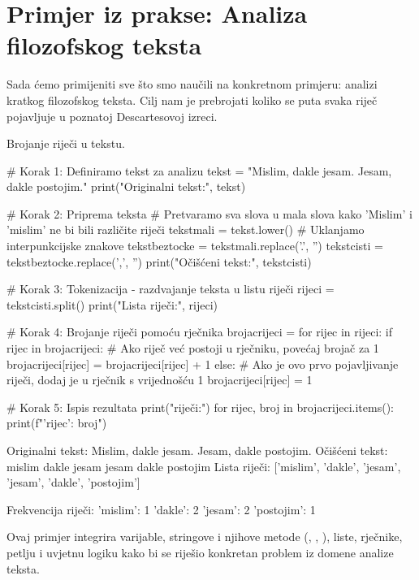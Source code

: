\section{Primjer iz prakse: Analiza filozofskog teksta}
\label{sec:primjerprakse}

Sada ćemo primijeniti sve što smo naučili na konkretnom primjeru: analizi kratkog filozofskog teksta. Cilj nam je prebrojati koliko se puta svaka riječ pojavljuje u poznatoj Descartesovoj izreci.

\begin{primjerokvir}
    Brojanje riječi u tekstu.
    \begin{pythoncode}
# Korak 1: Definiramo tekst za analizu
tekst = "Mislim, dakle jesam. Jesam, dakle postojim."
print("Originalni tekst:", tekst)

# Korak 2: Priprema teksta
# Pretvaramo sva slova u mala slova kako 'Mislim' i 'mislim' ne bi bili različite riječi
tekstmali = tekst.lower()
# Uklanjamo interpunkcijske znakove
tekstbeztocke = tekstmali.replace('.', '')
tekstcisti = tekstbeztocke.replace(',', '')
print("Očišćeni tekst:", tekstcisti)

# Korak 3: Tokenizacija - razdvajanje teksta u listu riječi
rijeci = tekstcisti.split()
print("Lista riječi:", rijeci)

# Korak 4: Brojanje riječi pomoću rječnika
brojacrijeci = {}
for rijec in rijeci:
    if rijec in brojacrijeci:
        # Ako riječ već postoji u rječniku, povećaj brojač za 1
        brojacrijeci[rijec] = brojacrijeci[rijec] + 1
    else:
        # Ako je ovo prvo pojavljivanje riječi, dodaj je u rječnik s vrijednošću 1
        brojacrijeci[rijec] = 1

# Korak 5: Ispis rezultata
print("\nFrekvencija riječi:")
for rijec, broj in brojacrijeci.items():
    print(f"'{rijec}': {broj}")
    \end{pythoncode}

    \begin{codeoutput}
Originalni tekst: Mislim, dakle jesam. Jesam, dakle postojim.
Očišćeni tekst: mislim dakle jesam jesam dakle postojim
Lista riječi: ['mislim', 'dakle', 'jesam', 'jesam', 'dakle', 'postojim']

Frekvencija riječi:
'mislim': 1
'dakle': 2
'jesam': 2
'postojim': 1
    \end{codeoutput}
    Ovaj primjer integrira varijable, stringove i njihove metode (, , ), liste, rječnike,  petlju i  uvjetnu logiku kako bi se riješio konkretan problem iz domene analize teksta.
\end{primjerokvir}

